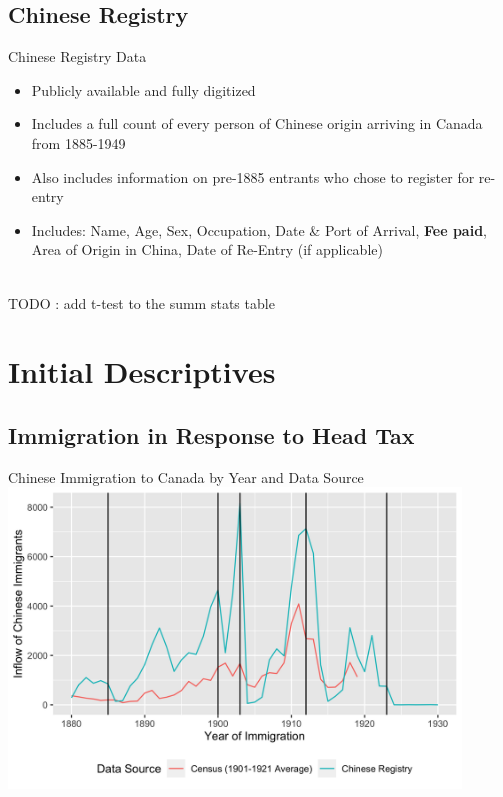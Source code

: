 \documentclass[pdf]{beamer}
\begin{document}
\subsection{Chinese Registry}
\begin{frame}{Chinese Registry Data}
    \centering
    \begin{itemize}
        \item Publicly available and fully digitized
        \item Includes a full count of every person of Chinese origin arriving in Canada from 1885-1949
        \item Also includes information on pre-1885 entrants who chose to register for re-entry 
        \item Includes: Name, Age, Sex, Occupation, Date \& Port of Arrival, \textbf{Fee paid}, Area of Origin in China, Date of Re-Entry (if applicable) 
    \end{itemize}
    \hyperlink{summstats}{} \\ 
    TODO : add t-test to the summ stats table 
\end{frame}



\section{Initial Descriptives}
\subsection{Immigration in Response to Head Tax}
\begin{frame}[label = yrimmchi]{Chinese Immigration to Canada by Year and Data Source}
    \centering
    \includegraphics[width = 0.9\textwidth]{../../figs/yrimmchi.png}
    \hyperlink{dateimmchi}{}
\end{frame}
\end{document}
